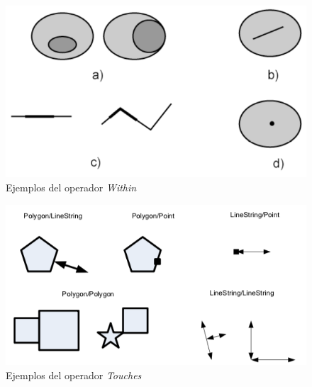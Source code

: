  \begin{figure}[H]
	\centering
	\includegraphics[width=0.7\linewidth]{imagenes/capitulo4/within}
	\caption{Ejemplos del operador \textit{Within} \cite{estandar}}
	\label{fig:within}
\end{figure}

 \begin{figure}[H]
 	\centering
 	\includegraphics[width=0.71\linewidth]{imagenes/capitulo4/touches1}
 	\caption{Ejemplos del operador \textit{Touches} \cite{estandar}}
 	\label{fig:touches}
 \end{figure}


